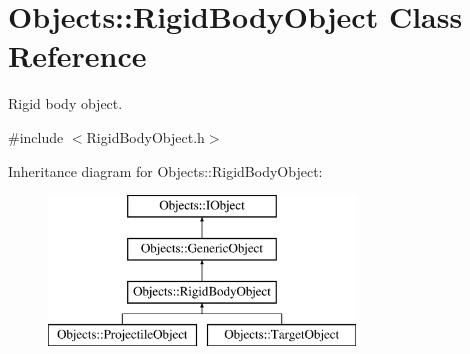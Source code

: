\hypertarget{class_objects_1_1_rigid_body_object}{\section{Objects\-:\-:Rigid\-Body\-Object Class Reference}
\label{class_objects_1_1_rigid_body_object}
}


Rigid body object.  




{\ttfamily \#include $<$Rigid\-Body\-Object.\-h$>$}

Inheritance diagram for Objects\-:\-:Rigid\-Body\-Object\-:\begin{figure}[H]
\begin{center}
\leavevmode
\includegraphics[height=4.000000cm]{class_objects_1_1_rigid_body_object}
\end{center}
\end{figure}
